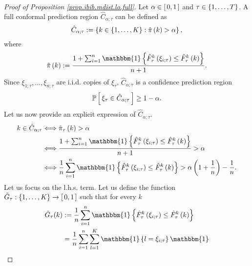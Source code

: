\documentclass[11pt]{article}
\begin{document}
\begin{proof}[Proof of Proposition \ref{prop.ibib.mdist.lo.full}]
Let $\alpha \in \left[\, 0, 1 \,\right]$ and $\tau \in \left\{ 1, \ldots, T \right\}$.
A full conformal prediction region $\hat{C}_{\alpha; \tau}$ can be defined as
\begin{align*}
    \hat{C}_{\alpha; \tau}
    := \left\{ 
        k \in \left\{ 1, \ldots, K \right\}:
        \hat{\pi}\left( k \right) > \alpha
     \right\},
\end{align*}
where
\begin{align*}
    \hat{\pi}\paren{k} :=
    \frac{1 
        + \sum_{i=1}^{n}
        \mathbbm{1}
        \brac{
            \hat{F}_{\tau}^{k} \paren{\xi_{i; \tau}}
            \leq \hat{F}_{\tau}^{k} \paren{k}
        }
    }{n+1}.
\end{align*}
%
%
%
Since $\xi_{1; \tau}, \ldots, \xi_{n; \tau}$ are i.i.d. copies of $\xi_{\tau}$,
$\hat{C}_{\alpha; \tau}$ is a confidence prediction region \citep{vovk2005algorithmic}
\begin{align*}
    \mathbb{P} \left[\, 
        \xi_{\tau} \in \hat{C}_{\alpha; \tau}
     \,\right] \geq 1 - \alpha.
\end{align*}
%
%
%
Let us now provide an explicit expression of $\hat{C}_{\alpha; \tau}$.
\begin{align*}
    k \in \hat{C}_{\alpha; \tau}
    &
    \Longleftrightarrow
    \hat{\pi}_{\tau}\paren {k} > \alpha
    \\
    &\Longleftrightarrow
    \frac{1 
        + \sum_{i=1}^{n}
        \mathbbm{1}
        \brac{
            \hat{F}_{\tau}^{k} \paren{\xi_{i; \tau}}
            \leq \hat{F}_{\tau}^{k} \paren{k}
        }
    }{n+1} > \alpha
    \\
    &\Longleftrightarrow
    \frac{1}{n}
    \sum_{i=1}^{n}
    \mathbbm{1}
    \brac{
        \hat{F}_{\tau}^{k} \paren{\xi_{i; \tau}}
        \leq \hat{F}_{\tau}^{k} \paren{k}
    }
    >
    \alpha \paren{1 + \frac{1}{n}} - \frac{1}{n}.
\end{align*}
%
%
%
Let us focus on the l.h.s. term. Let us define the function $\tilde{G}_{\tau} : \left\{ 1, \ldots, K \right\} \to \left[\, 0, 1 \,\right]$
such that for every $k$
\begin{align*}
    \tilde{G}_{\tau}(k)
    &
    :=
    \frac{1}{n}
    \sum_{i=1}^{n}
    \mathbbm{1}
    \brac{
        \hat{F}_{\tau}^{k} \paren{\xi_{i; \tau}}
        \leq \hat{F}_{\tau}^{k} \paren{k}
    }
    \\
    &
    =
    \frac{1}{n}
    \sum_{i=1}^{n}
    \sum_{l=1}^{K}
    \mathbbm{1}
    \brac{l = \xi_{i; \tau}}
    \mathbbm{1}

\end{align*}
\end{proof}
\end{document}
